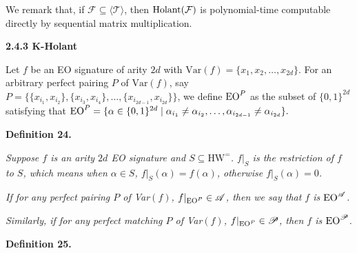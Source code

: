 \documentclass[10pt,a4paper]{article}
\begin{document}



We remark that, if $\mathcal{F}\subseteq\langle\mathcal{T}\rangle$, then $\textup{{Holant}}(\mathcal{F})$ is polynomial-time computable directly by sequential matrix multiplication.\par





\par\medskip\noindent\textbf{
2.4.3 K-Holant
}\par




Let $f$ be an EO signature of arity $2d$ with $\text{Var}(f)=\{x_{1},x_{2},\ldots,x_{2d}\}$. For an arbitrary perfect pairing $P$ of $\text{Var}(f)$, say $P=\{\{x_{i_{1}},x_{i_{2}}\},\{x_{i_{3}},x_{i_{4}}\},\ldots,\{x_{i_{2d-1}},x_{i_{2d}}\}\}$, we define $\textup{{EO}}^{P}$ as the subset of $\{0,1\}^{2d}$ satisfying that $\textup{{EO}}^{P}=\{\alpha\in\{0,1\}^{2d}\mid\alpha_{i_{1}}\neq\alpha_{i_{2}},\ldots,\alpha_{i_{2d-1}}\neq\alpha_{i_{2d}}\}.$\par





\par\medskip\noindent\textbf{
\textbf{Definition 24}\textbf{.}
}\par



\emph{Suppose $f$ is an arity $2d$ EO signature and $S\subseteq\text{HW}^{=}$. $f|_{S}$ is the restriction of $f$ to $S$, which means when $\alpha\in S$, $f|_{S}(\alpha)=f(\alpha)$, otherwise $f|_{S}(\alpha)=0$.}\par




\emph{If for any perfect pairing $P$ of Var$(f)$, $f|_{\textup{{EO}}^{P}}\in\mathscr{A}$, then we say that $f$ is $\textup{{EO}}^{\mathscr{A}}$.}\par




\emph{Similarly, if for any perfect matching $P$ of Var$(f)$, $f|_{\textup{{EO}}^{P}}\in\mathscr{P}$, then $f$ is $\textup{{EO}}^{\mathscr{P}}$.}\par







\par\medskip\noindent\textbf{
\textbf{Definition 25}\textbf{.}
}\par
\end{document}
